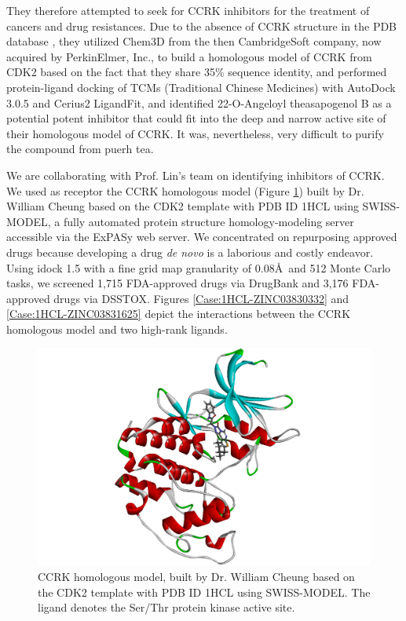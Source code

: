 They therefore attempted to seek for CCRK inhibitors for the treatment of cancers and drug resistances. Due to the absence of CCRK structure in the PDB database \citep{540,537}, they utilized Chem3D from the then CambridgeSoft company, now acquired by PerkinElmer, Inc., to build a homologous model of CCRK from CDK2 based on the fact that they share 35\% sequence identity, and performed protein-ligand docking of TCMs (Traditional Chinese Medicines) with AutoDock 3.0.5 and Cerius2 LigandFit, and identified 22-O-Angeloyl theasapogenol B as a potential potent inhibitor that could fit into the deep and narrow active site of their homologous model of CCRK. It was, nevertheless, very difficult to purify the compound from puerh tea.

We are collaborating with Prof. Lin's team on identifying inhibitors of CCRK. We used as receptor the CCRK homologous model (Figure \ref{Case:CCRKHomologousModel}) built by Dr. William Cheung based on the CDK2 template with PDB ID 1HCL \citep{1142} using SWISS-MODEL, a fully automated protein structure homology-modeling server accessible via the ExPASy web server. We concentrated on repurposing approved drugs \citep{944,1023} because developing a drug \textit{de novo} is a laborious and costly endeavor. Using idock 1.5 with a fine grid map granularity of 0.08\AA\ and 512 Monte Carlo tasks, we screened 1,715 FDA-approved drugs via DrugBank and 3,176 FDA-approved drugs via DSSTOX. Figures \ref{Case:1HCL-ZINC03830332} and \ref{Case:1HCL-ZINC03831625} depict the interactions between the CCRK homologous model and two high-rank ligands.

\begin{figure}
\centering
\includegraphics[width=\linewidth]{Case/CCRKHomologousModel.png}
\caption{CCRK homologous model, built by Dr. William Cheung based on the CDK2 template with PDB ID 1HCL \citep{1142} using SWISS-MODEL. The ligand denotes the Ser/Thr protein kinase active site.}
\label{Case:CCRKHomologousModel}
\end{figure}


